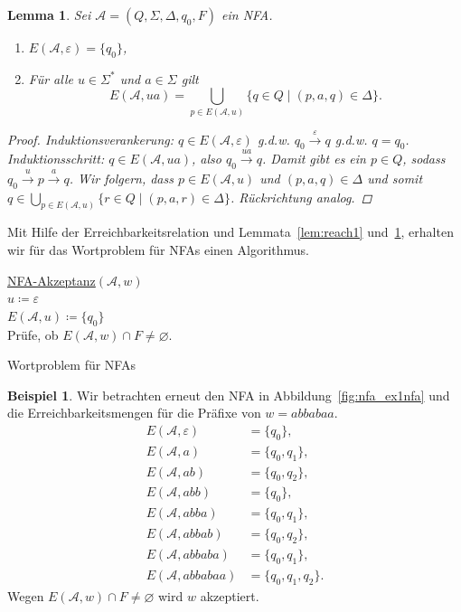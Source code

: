 \documentclass[11pt, a4paper]{article}
\theoremstyle{definition}
\newtheorem{example}[definition]{Beispiel}
\theoremstyle{plain}
\newtheorem{lemma}[definition]{Lemma}
\numberwithin{equation}{section}
\newcommand{\reaches}[1]{\overset{#1}{\rightarrow}}
\let\emptyset\varnothing
\begin{document}
\begin{lemma}\label{lem:reach2}
	Sei \( \mathcal{A} = (Q, \Sigma, \Delta, q_0, F) \) ein NFA.
	\begin{enumerate}
		\item \( E(\mathcal{A}, \varepsilon) = \{q_0\} \),
		\item Für alle \( u \in \Sigma^\ast \) und \( a \in \Sigma \) gilt
			\[
				E(\mathcal{A}, ua) = \bigcup_{p \in E(\mathcal{A}, u)} \{ q \in Q \mid (p, a, q) \in \Delta \}.
			\]
	\end{enumerate}
	\begin{proof}
		Induktionsverankerung: \( q \in E(\mathcal{A}, \varepsilon) \) {g.d.w.} \( q_0 \reaches{\varepsilon} q \) {g.d.w.} \( q = q_0 \). \checkmark\\
		Induktionsschritt: \( q \in E(\mathcal{A}, ua) \), also \( q_0 \reaches{ua} q \). Damit gibt es ein \( p \in Q \), sodass \( q_0 \reaches{u} p \reaches{a} q \). Wir folgern, dass \( p \in E(\mathcal{A}, u) \) und \( (p, a, q) \in \Delta \) und somit \( q \in \bigcup_{p \in E(\mathcal{A}, u)} \{ r \in Q \mid (p, a, r) \in \Delta \} \). Rückrichtung analog.
	\end{proof}
\end{lemma}
Mit Hilfe der Erreichbarkeitsrelation und Lemmata~\ref{lem:reach1} und~\ref{lem:reach2}, erhalten wir für das Wortproblem für NFAs einen Algorithmus.
\begin{algorithm}
	\underline{NFA-Akzeptanz}{$(\mathcal{A}, w)$}\\
	$u \coloneqq \varepsilon$\\
	$E(\mathcal{A}, u) \coloneqq \{ q_0 \}$\\	
	Prüfe, ob $E(\mathcal{A}, w) \cap F \neq \emptyset$.
	\caption{Wortproblem für NFAs}
	\label{alg:nfaacc}
\end{algorithm}
\begin{example}
	Wir betrachten erneut den NFA in Abbildung~\ref{fig:nfa_ex1nfa} und die Erreichbarkeitsmengen für die Präfixe von \( w = abbabaa \).
	\begin{align*}
		E(\mathcal{A}, \varepsilon) &= \{ q_0 \},\\
		E(\mathcal{A}, a) &= \{ q_0, q_1 \},\\
		E(\mathcal{A}, ab) &= \{ q_0, q_2 \},\\
		E(\mathcal{A}, abb) &= \{ q_0 \},\\
		E(\mathcal{A}, abba) &= \{ q_0, q_1 \},\\
		E(\mathcal{A}, abbab) &= \{ q_0, q_2 \},\\
		E(\mathcal{A}, abbaba) &= \{ q_0, q_1 \},\\
		E(\mathcal{A}, abbabaa) &= \{ q_0, q_1, q_2 \}.
	\end{align*}
	Wegen \( E(\mathcal{A}, w) \cap F \neq \emptyset \) wird \( w \) akzeptiert.
\end{example}
\end{document}

